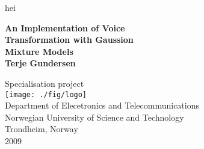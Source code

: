 \begin{titlepage}
 
\begin{center}
 
\color{white} hei\\[1cm]
\color{black}

{ \huge \textbf{An Implementation of Voice\\[0.2cm] Transformation with Gaussion\\[0.5cm] Mixture Models}}\\[3cm]


 
{\LARGE \bf Terje Gundersen}
 
\vfill

\large Specialisation project \\[1.5cm]

\texttt{[image: ./fig/logo]}\\[0.5cm]
 



\large Department of Elecetronics and Telecommunications\\
Norwegian University of Science and Technology\\
Trondheim, Norway\\[0.5cm]


2009
 
\end{center}
 
\end{titlepage}
